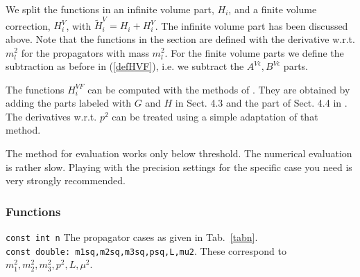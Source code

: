 \documentclass[12pt,a4paper]{article}
\newcommand{\mytt}[1]{\texttt{#1}}
\begin{document}
We split the functions in an infinite volume part, $H_i$, and a finite
volume correction, $H^V_i$, with
$\tilde H^V_i= H_i+ H^V_i$. The infinite volume part has been
discussed above.
Note that the functions in the section are defined with the derivative
w.r.t. $m_l^2$ for the propagators with mass $m_l^2$.
For the finite volume parts we define the subtraction
as before in (\ref{defHVF}), i.e. we subtract the $A^{V\epsilon},B^{V\epsilon}$
parts.

The functions $H^{VF}_i$ can be computed with the methods
of \cite{Bijnens:2013doa}.
They are obtained by adding the parts labeled with $G$ and $H$ in Sect. 4.3 and
the part of Sect. 4.4 in \cite{Bijnens:2013doa}.
The derivatives w.r.t. $p^2$ can be treated using a simple adaptation of that method.

The method for evaluation works only below threshold. The numerical evaluation
is rather slow. Playing with the precision settings for the specific case
you need is very strongly recommended.

\subsubsection{Functions}

\mytt{const int n} The propagator cases as given in Tab.~\ref{tabn}.\\
\mytt{const double: m1sq,m2sq,m3sq,psq,L,mu2}. These correspond
to $m_1^2,m_2^2,m_3^2,p^2,L,\mu^2$.\\
\end{document}
